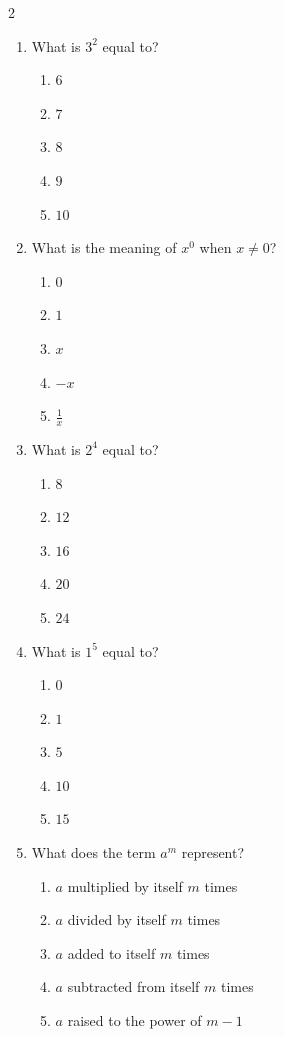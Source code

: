 \documentclass[10pt]{article}
\begin{document}
\begin{multicols}{2}
\begin{enumerate}[label=\textbf{Q\arabic*.}, leftmargin=*, itemsep=6pt, parsep=0pt]
  \item \small What is $3^2$ equal to?
  \begin{enumerate}[label=(\Alph*), leftmargin=0.6cm, nosep, itemsep=2pt]
    \item $6$
    \item $7$
    \item $8$
    \item $9$
    \item $10$
  \end{enumerate}

  \item \small What is the meaning of $x^0$ when $x \neq 0$?
  \begin{enumerate}[label=(\Alph*), leftmargin=0.6cm, nosep, itemsep=2pt]
    \item $0$
    \item $1$
    \item $x$
    \item $-x$
    \item $\frac{1}{x}$
  \end{enumerate}

  \item \small What is $2^4$ equal to?
  \begin{enumerate}[label=(\Alph*), leftmargin=0.6cm, nosep, itemsep=2pt]
    \item $8$
    \item $12$
    \item $16$
    \item $20$
    \item $24$
  \end{enumerate}

  \item \small What is $1^5$ equal to?
  \begin{enumerate}[label=(\Alph*), leftmargin=0.6cm, nosep, itemsep=2pt]
    \item $0$
    \item $1$
    \item $5$
    \item $10$
    \item $15$
  \end{enumerate}

  \item \small What does the term $a^m$ represent?
  \begin{enumerate}[label=(\Alph*), leftmargin=0.6cm, nosep, itemsep=2pt]
    \item $a$ multiplied by itself $m$ times
    \item $a$ divided by itself $m$ times
    \item $a$ added to itself $m$ times
    \item $a$ subtracted from itself $m$ times
    \item $a$ raised to the power of $m-1$
  \end{enumerate}

\end{enumerate}
\end{multicols}
\end{document}
